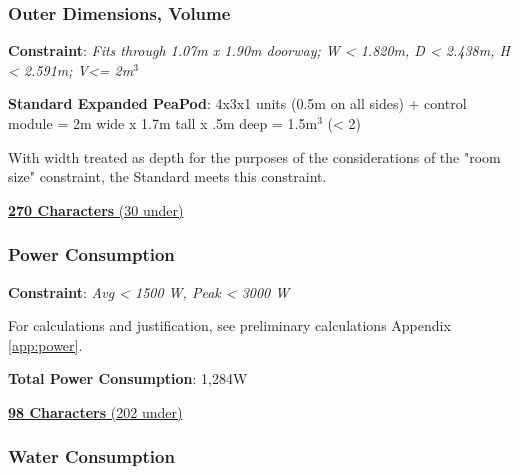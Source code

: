 \documentclass{report}
\begin{document}
\subsubsection{Outer Dimensions, Volume}
\label{sec:constraints-volume}

\textbf{Constraint}: \textit{Fits through 1.07m x 1.90m doorway; W < 1.820m, D < 2.438m, H < 2.591m; V<= 2m${}^3$}



\textbf{Standard Expanded PeaPod}: 4x3x1 units (0.5m on all sides) + control module = 2m wide x 1.7m tall x .5m deep = 1.5m${}^3$ (< 2)

With width treated as depth for the purposes of the considerations of the "room size" constraint, the Standard meets this constraint.

\uline{\textbf{270 Characters} (30 under)}

\vspace{0.5cm}

\subsubsection{Power Consumption}
\label{sec:constraints-power}

\textbf{Constraint}: \textit{Avg < 1500 W, Peak < 3000 W}

For calculations and justification, see preliminary calculations Appendix \ref{app:power}.

\textbf{Total Power Consumption}: 1,284W

\uline{\textbf{98 Characters} (202 under)}

\newpage

\subsubsection{Water Consumption}
\label{sec:constraints-water}
\end{document}
